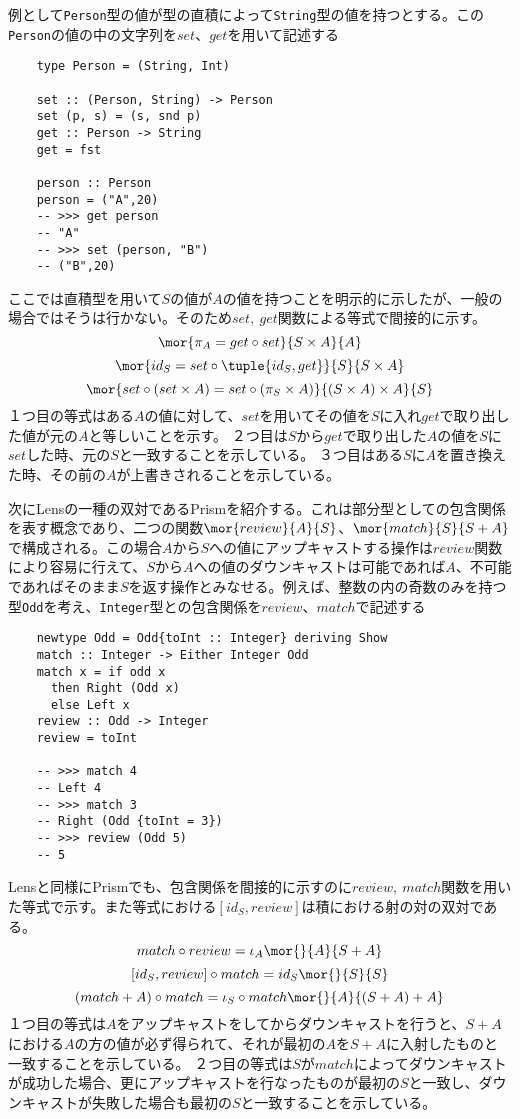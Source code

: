 \documentclass[uplatex,dvipdfmx]{jsarticle}
\newcommand{\pr}[1]{\colorbox[rgb]{0.9,0.9,0.9}{\lstinline{#1}}}
\begin{document}
  例として\pr{Person}型の値が型の直積によって\pr{String}型の値を持つとする。この\pr{Person}の値の中の文字列を$set$、$get$を用いて記述する
  \begin{lstlisting}
    type Person = (String, Int)

    set :: (Person, String) -> Person
    set (p, s) = (s, snd p)
    get :: Person -> String
    get = fst

    person :: Person
    person = ("A",20)
    -- >>> get person
    -- "A"
    -- >>> set (person, "B")
    -- ("B",20)
  \end{lstlisting}
  ここでは直積型を用いて$S$の値が$A$の値を持つことを明示的に示したが、一般の場合ではそうは行かない。そのため$set,\ get$関数による等式で間接的に示す。
  \[\mor{\pi_A = get\circ set}{S\times A}{A}\]
  \[\mor{id_S = set\circ\tuple{id_S,get}}{S}{S\times A}\]
  \[\mor{set\circ(set\times A) = set\circ (\pi_S\times A)}{(S\times A)\times A}{S}\]
  １つ目の等式はある$A$の値に対して、$set$を用いてその値を$S$に入れ$get$で取り出した値が元の$A$と等しいことを示す。
  ２つ目は$S$から$get$で取り出した$A$の値を$S$に$set$した時、元の$S$と一致することを示している。
  ３つ目はある$S$に$A$を置き換えた時、その前の$A$が上書きされることを示している。

  次にLensの一種の双対であるPrismを紹介する。これは部分型としての包含関係を表す概念であり、二つの関数$\mor{review}{A}{S}$、$\mor{match}{S}{S+A}$で構成される。この場合$A$から$S$への値にアップキャストする操作は$review$関数により容易に行えて、$S$から$A$への値のダウンキャストは可能であれば$A$、不可能であればそのまま$S$を返す操作とみなせる。例えば、整数の内の奇数のみを持つ型\pr{Odd}を考え、\pr{Integer}型との包含関係を$review$、$match$で記述する
  \begin{lstlisting}   
    newtype Odd = Odd{toInt :: Integer} deriving Show
    match :: Integer -> Either Integer Odd
    match x = if odd x 
      then Right (Odd x)
      else Left x
    review :: Odd -> Integer
    review = toInt

    -- >>> match 4
    -- Left 4
    -- >>> match 3
    -- Right (Odd {toInt = 3})
    -- >>> review (Odd 5)
    -- 5
  \end{lstlisting}
  Lensと同様にPrismでも、包含関係を間接的に示すのに$review,\ match$関数を用いた等式で示す。また等式における$[id_S,review]$は積における射の対の双対である。
  \[match\circ review = \iota_A\mor{}{A}{S+A}\]
  \[[id_S,review]\circ match = id_S\mor{}{S}{S}\]
  \[(match+A)\circ match = \iota_S\circ match\mor{}{A}{(S+A)+A}\]
  １つ目の等式は$A$をアップキャストをしてからダウンキャストを行うと、$S+A$における$A$の方の値が必ず得られて、それが最初の$A$を$S+A$に入射したものと一致することを示している。
  ２つ目の等式は$S$が$match$によってダウンキャストが成功した場合、更にアップキャストを行なったものが最初の$S$と一致し、ダウンキャストが失敗した場合も最初の$S$と一致することを示している。
  
\end{document}
